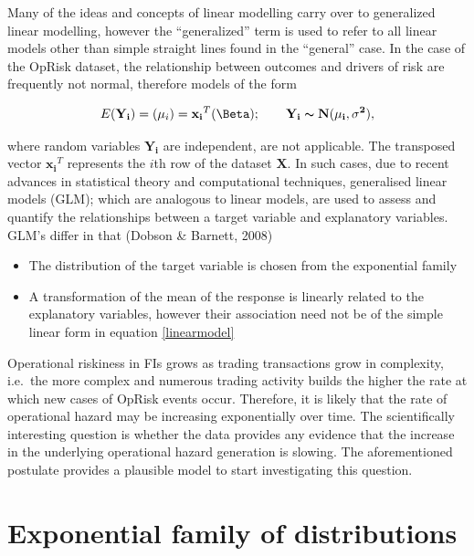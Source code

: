 \documentclass{DissertateUSU}
\begin{document}
Many of the ideas and concepts of linear modelling carry over to
generalized linear modelling, however the ``generalized'' term is used
to refer to all linear models other than simple straight lines found in
the ``general'' case. In the case of the OpRisk dataset, the
relationship between outcomes and drivers of risk are frequently not
normal, therefore models of the form

\singlespacing

\begin{eqnarray}\label{linearmodel}
E(\mathbf{Y_i}) = \mathbf(\mu_i) = \mathbf{x_i}^T\mathbf(\Beta); \qquad \mathbf{Y_i} \thicksim \mathbf{N(\mu_i, \sigma^2)},
\end{eqnarray} \doublespacing

where random variables \(\mathbf{Y_i}\) are independent, are not
applicable. The transposed vector \(\mathbf{x_i}^T\) represents the
\(i\)th row of the dataset \(\mathbf{X}\). In such cases, due to recent
advances in statistical theory and computational techniques, generalised
linear models (GLM); which are analogous to linear models, are used to
assess and quantify the relationships between a target variable and
explanatory variables. GLM's differ in that (Dobson \& Barnett, 2008)

\begin{itemize}
\item The distribution of the target variable is chosen from the exponential family
\item A transformation of the mean of the response is linearly related to the explanatory variables, however their association need not be of the simple linear form in equation \ref{linearmodel}
\end{itemize}

Operational riskiness in FIs grows as trading transactions grow in
complexity, i.e.~the more complex and numerous trading activity builds
the higher the rate at which new cases of OpRisk events occur.
Therefore, it is likely that the rate of operational hazard may be
increasing exponentially over time. The scientifically interesting
question is whether the data provides any evidence that the increase in
the underlying operational hazard generation is slowing. The
aforementioned postulate provides a plausible model to start
investigating this question.\medskip

\section{Exponential family of distributions}
\label{sec: Exponential family of distributions}
\end{document}
